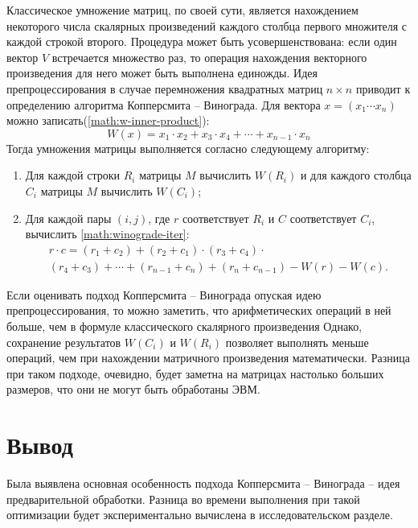 Классическое умножение матриц, по своей сути, является нахождением некоторого числа скалярных произведений каждого столбца первого множителя с каждой строкой второго. Процедура может быть усовершенствована: если один вектор $V$ встречается множество раз, то операция нахождения векторного произведения для него может быть выполнена единожды. Идея препроцессирования в случае перемножения квадратных матриц $n \times n$ приводит к определению алгоритма Копперсмита – Винограда. Для вектора $x = \left(x_1 \cdots x_n\right)$ можно записать(\ref{math:w-inner-product}):
\begin{equation}\label{math:w-inner-product}
	W(x) = x_1 \cdot x_2 + x_3 \cdot x_4 + \cdots + x_{n - 1} \cdot x_n
\end{equation}
Тогда умножения матрицы выполняется согласно следующему алгоритму:
\begin{enumerate}
	\item Для каждой строки $R_i$ матрицы $M$ вычислить $W(R_i)$ и для каждого столбца $C_i$ матрицы $M$ вычислить $W(C_i)$;
	\item Для каждой пары $(i ,j)$, где $r$ соответствует $R_i$ и $C$ соответствует $C_i$, вычислить \ref{math:winograde-iter}:
	\begin{equation}\label{math:winograde-iter} 
	\begin{array}{cc}
		r \cdot c = \left(r_1 + c_2\right) + \left(r_2 + c_1\right) \cdot \left(r_3 + c_4\right) \cdot \\
		\left(r_4 + c_3\right) + \cdots +  \left(r_{n - 1} + c_n\right) + \left(r_{n} + c_{n - 1}\right) - W\left(r\right) - W\left(c\right).
	\end{array}
	\end{equation}
\end{enumerate}

Если оценивать подход Копперсмита – Винограда опуская идею препроцессирования, то можно заметить, что арифметических операций в ней больше, чем в формуле классического скалярного произведения Однако, сохранение результатов $W(C_i)$ и $W(R_i)$ позволяет выполнять меньше операций, чем при нахождении матричного произведения математически. Разница при таком подходе, очевидно, будет заметна на матрицах настолько больших размеров, что они не могут быть обработаны ЭВМ. 

\section{Вывод}
Была выявлена основная особенность подхода Копперсмита – Винограда -- идея предварительной обработки. Разница во времени выполнения при такой оптимизации будет экспериментально вычислена в исследовательском разделе. 
